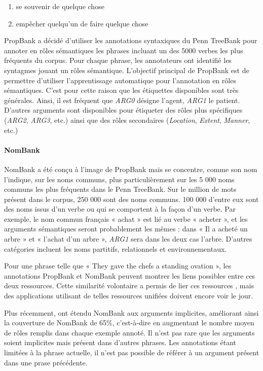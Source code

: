 \begin{enumerate}
    \item se souvenir de quelque chose
    \item empêcher quelqu'un de faire quelque chose
\end{enumerate}

PropBank \citep{palmer2005proposition} a décidé d'utiliser les annotations
syntaxiques du Penn TreeBank \citep{marcus1993building} pour annoter en rôles
sémantiques les phrases incluant un des 5000 verbes les plus fréquents du
corpus. Pour chaque phrase, les annotateurs ont identifié les syntagmes jouant
un rôles sémantique. L'objectif principal de PropBank est de permettre
d'utiliser l'apprentissage automatique pour l'annotation en rôles sémantiques.
C'est pour cette raison que les étiquettes disponibles sont très générales.
Ainsi, il est fréquent que \textit{ARG0} désigne l'agent, \textit{ARG1} le
patient. D'autres arguments sont disponibles pour étiqueter des rôles plus
spécifiques (\textit{ARG2}, \textit{ARG3}, etc.) ainsi que des rôles
secondaires (\textit{Location}, \textit{Extent}, \textit{Manner}, etc.)

\paragraph{NomBank}

NomBank \citep{meyers2004nombank} a été conçu à l'image de PropBank mais se
concentre, comme son nom l'indique, sur les noms communs, plus particulièrement
sur les 5 000 noms communs les plus fréquents dans le Penn TreeBank. Sur le
million de mots présent dans le corpus, 250 000 sont des noms communs. 100 000
d'entre eux sont des noms issus d'un verbe ou qui se comportent à la façon d'un
verbe. Par exemple, le nom commun français « achat » est lié au verbe « acheter
», et les arguments sémantiques seront probablement les mêmes : dans « Il a
acheté un arbre » et « l'achat d'un arbre », \textit{ARG1} sera dans les deux
cas l'arbre. D'autres catégories incluent les noms partitifs, relationnels et
environnementaux.

Pour une phrase telle que « They gave the chefs a standing ovation », les
annotations PropBank et NomBank peuvent montrer les liens possibles entre ces
deux ressources. Cette similarité volontaire a permis de lier ces ressources
\citep{pustejovsky2005merging,verhagen2007combining}, mais des applications
utilisant de telles ressources unifiées doivent encore voir le jour.

Plus récemment, \cite{gerber2010beyond} ont étendu NomBank aux arguments
implicites, améliorant ainsi la couverture de NomBank de 65\%, c'est-à-dire en
augmentant le nombre moyen de rôles remplis dans chaque exemple annoté. Il
n'est pas rare que les arguments soient implicites mais présent dans d'autres
phrases. Les annotations étant limitées à la phrase actuelle, il n'est pas
possible de référer à un argument présent dans une prase précédente.

